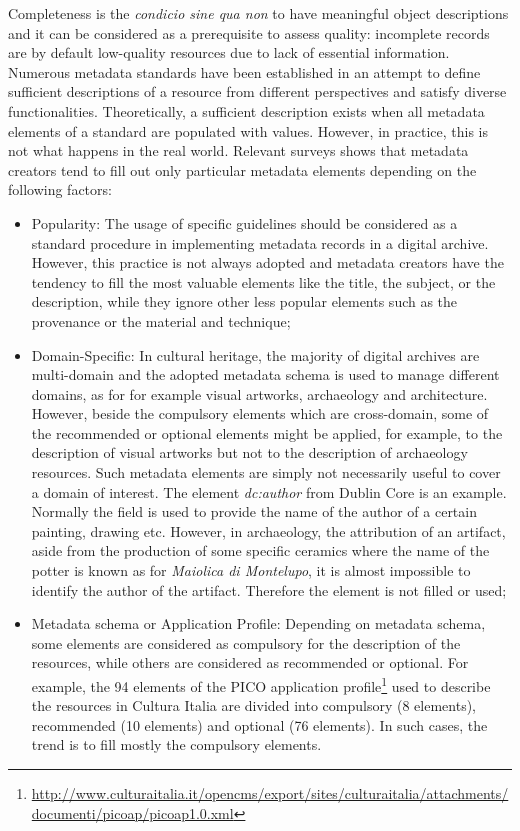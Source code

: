 \documentclass[epsfig,a4paper,12pt,titlepage]{book}
\begin{document}
Completeness is the \textit{condicio sine qua non} to have meaningful object descriptions and it can be considered as a prerequisite to assess quality: incomplete records are by default low-quality resources due to lack of essential information. 
Numerous metadata standards have been established in an attempt to define sufficient descriptions of a resource from different perspectives and satisfy diverse functionalities. Theoretically, a sufficient description exists when all metadata elements of a standard are populated with values. However, in practice, this is not what happens in the real world. Relevant surveys \cite{guinchard2002dublin, najjar2003actual} shows that metadata creators tend to fill out only particular metadata elements depending on the following factors:
\begin{itemize}
    \item Popularity: The usage of specific guidelines should be considered as a standard procedure in implementing metadata records in a digital archive. However, this practice is not always adopted and  metadata creators have the tendency to fill the most valuable elements like the title, the subject, or the description, while they ignore other less popular elements such as the provenance or the material and technique; 
    \item Domain-Specific:  In cultural heritage, the majority of digital archives are multi-domain and the adopted metadata schema is used to manage different domains, as for for example visual artworks, archaeology and architecture. However, beside the compulsory elements which are cross-domain, some of the recommended or optional elements might be applied, for example, to the description of visual artworks but not to the description of archaeology resources. Such metadata elements are simply not necessarily useful to cover a domain of interest. The element \textit{dc:author} from Dublin Core is an example. Normally the field is used to provide the name of the author of a certain painting, drawing etc. However, in archaeology, the attribution of an artifact, aside from the production of some specific ceramics where the name of the potter is known as for \textit{Maiolica di Montelupo}, it is almost impossible to identify the author of the artifact. Therefore the element is not filled or used;
    \item Metadata schema or Application Profile: Depending on metadata schema, some elements are considered as compulsory for the description of the resources, while others are considered as recommended or optional. For example, the 94 elements of the PICO application profile\footnote{\url{http://www.culturaitalia.it/opencms/export/sites/culturaitalia/attachments/documenti/picoap/picoap1.0.xml}} used to describe the resources in Cultura Italia are divided into compulsory (8 elements), recommended (10 elements) and optional (76 elements). In such cases, the trend is to fill mostly the compulsory elements. 
\end{itemize}
\end{document}
